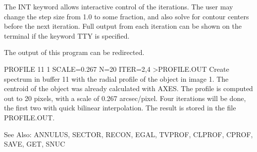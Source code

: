 The INT keyword allows interactive control of the iterations.  The user may
change the step size from 1.0 to some fraction, and also solve for contour
centers before the next iteration. Full output from each iteration can be
shown on the terminal if the keyword TTY is specified.

The output of this program can be redirected.

\begin{example}
  \item[PROFILE 11 1 SCALE=0.267 N=20 ITER=2,4 >PROFILE.OUT\hfill]{Create
       spectrum in buffer 11 with the radial profile of the object in image
       1.  The centroid of the object was already calculated with AXES.
       The profile is computed out to 20 pixels, with a scale of 0.267
       arcsec/pixel.  Four iterations will be done, the first two with
       quick bilinear interpolation.  The result is stored in the file
       PROFILE.OUT.}
\end{example}

See Also: ANNULUS, SECTOR, RECON, EGAL, TVPROF, CLPROF, CPROF, 
          SAVE, GET, SNUC


